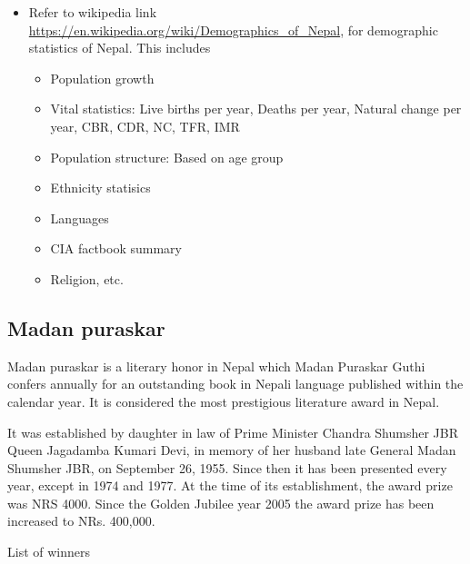 \documentclass[
  openany]{book}
\providecommand{\tightlist}{%
  \setlength{\itemsep}{0pt}\setlength{\parskip}{0pt}}
\begin{document}
\begin{itemize}
\tightlist
\item
  Refer to wikipedia link \url{https://en.wikipedia.org/wiki/Demographics_of_Nepal}, for demographic statistics of Nepal. This includes

  \begin{itemize}
  \tightlist
  \item
    Population growth
  \item
    Vital statistics: Live births per year, Deaths per year, Natural change per year, CBR, CDR, NC, TFR, IMR
  \item
    Population structure: Based on age group
  \item
    Ethnicity statisics
  \item
    Languages
  \item
    CIA factbook summary
  \item
    Religion, etc.
  \end{itemize}
\end{itemize}

\hypertarget{madan-puraskar}{%
\subsection{Madan puraskar}\label{madan-puraskar}}

Madan puraskar is a literary honor in Nepal which Madan Puraskar Guthi confers annually for an outstanding book in Nepali language published within the calendar year. It is considered the most prestigious literature award in Nepal.

It was established by daughter in law of Prime Minister Chandra Shumsher JBR Queen Jagadamba Kumari Devi, in memory of her husband late General Madan Shumsher JBR, on September 26, 1955. Since then it has been presented every year, except in 1974 and 1977. At the time of its establishment, the award prize was NRS 4000. Since the Golden Jubilee year 2005 the award prize has been increased to NRs. 400,000.

List of winners

\begingroup\fontsize{8}{10}\selectfont
\end{document}
